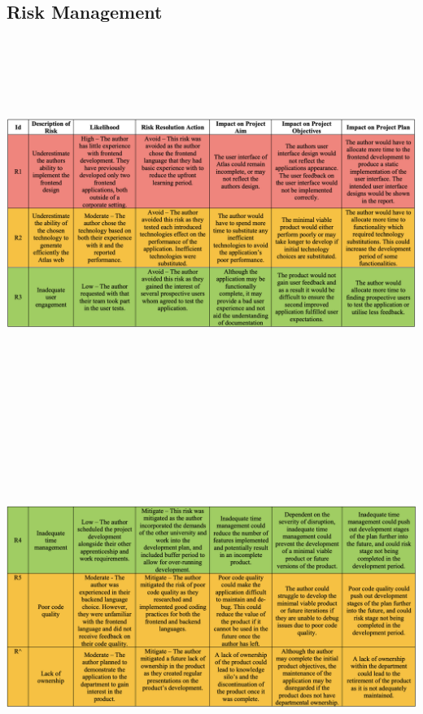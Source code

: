 \documentclass{article}
\begin{document}
\newpage
\begin{landscape}
\thispagestyle{empty}

\section{Risk Management}
  \centering
      \includegraphics[height=12cm]{images/risk1.png}
\vfill
{}

\newpage
\thispagestyle{empty}
  \centering

\includegraphics[height=12cm]{images/risk2.png}

\vfill
{}
\end{landscape}
\end{document}
